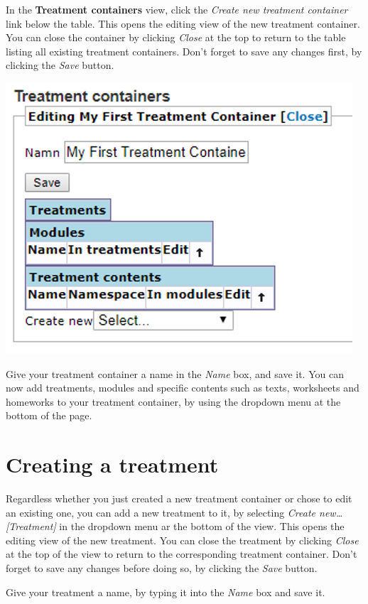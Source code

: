 \documentclass[]{book}
\begin{document}
In the \textbf{Treatment containers} view, click the \emph{Create new treatment container} link below the table. This opens the editing view of the new treatment container. You can close the container by clicking \emph{Close} at the top to return to the table listing all existing treatment containers. Don't forget to save any changes first, by clicking the \emph{Save} button.

\includegraphics{images/new-images/treatmentsEditContainer.png}

Give your treatment container a name in the \emph{Name} box, and save it.
You can now add treatments, modules and specific contents such as texts, worksheets and homeworks to your treatment container, by using the dropdown menu at the bottom of the page.

\hypertarget{creating-a-treatment}{%
\section{Creating a treatment}\label{creating-a-treatment}}

Regardless whether you just created a new treatment container or chose to edit an existing one, you can add a new treatment to it, by selecting \emph{Create new\ldots{} {[}Treatment{]}} in the dropdown menu ar the bottom of the view. This opens the editing view of the new treatment. You can close the treatment by clicking \emph{Close} at the top of the view to return to the corresponding treatment container. Don't forget to save any changes before doing so, by clicking the \emph{Save} button.

Give your treatment a name, by typing it into the \emph{Name} box and save it.
\end{document}
